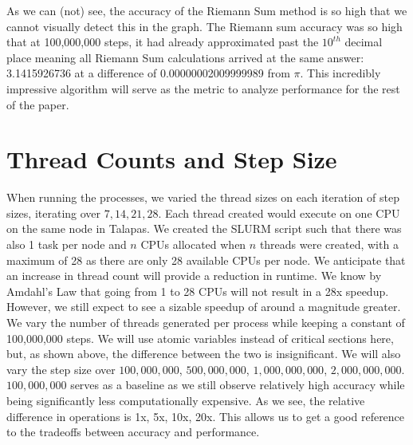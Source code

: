 \documentclass{article}
\begin{document}
\begin{multicols}{2}
As we can (not) see, the accuracy of the Riemann Sum method is so high that we cannot visually detect this in the graph. The Riemann sum accuracy was so high that at 100,000,000 steps, it had already approximated past the $10^{th}$ decimal place meaning all Riemann Sum calculations arrived at the same answer: 3.1415926736 at a difference of 0.00000002009999989 from $\pi$. This incredibly impressive algorithm will serve as the metric to analyze performance for the rest of the paper.

\section{Thread Counts and Step Size}
When running the processes, we varied the thread sizes on each iteration of step sizes, iterating over $7, 14, 21, 28$. Each thread created would execute on one CPU on the same node in Talapas. We created the SLURM script such that there was also 1 task per node and $n$ CPUs allocated when $n$ threads were created, with a maximum of 28 as there are only 28 available CPUs per node. We anticipate that an increase in thread count will provide a reduction in runtime. We know by Amdahl's Law that going from 1 to 28 CPUs will not result in a 28x speedup. However, we still expect to see a sizable speedup of around a magnitude greater. We vary the number of threads generated per process while keeping a constant of 100,000,000 steps. We will use atomic variables instead of critical sections here, but, as shown above, the difference between the two is insignificant. 
We will also vary the step size over $100,000,000$, $500,000,000$, $1,000,000,000$, $2,000,000,000$. $100,000,000$ serves as a baseline as we still observe relatively high accuracy while being significantly less computationally expensive. As we see, the relative difference in operations is 1x, 5x, 10x, 20x. This allows us to get a good reference to the tradeoffs between accuracy and performance.


\end{multicols}
\end{document}
